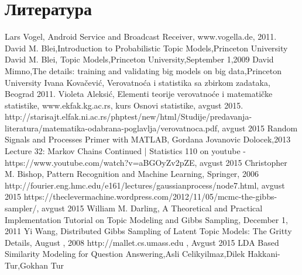 %
%
\chapter{Литература}
\begin{thebibliography}{11}
 {Lars Vogel, Android Service and Broadcast Receiver, www.vogella.de, 2011.}
 { David M. Blei,Introduction to Probabilistic Topic Models,Princeton University}
 { David M. Blei, Topic Models,Princeton University,September 1,2009}
 { David Mimno,The details: training	and validating big	models on big data,Princeton University}
 {Ivana Kovačević, Verovatnoća i statistika sa zbirkom zadataka, Beograd 2011.}
 {Violeta Aleksić, Elementi teorije verovatnoće i matematičke statistike, }
 {www.ekfak.kg.ac.rs, kurs Osnovi statistike, avgust 2015.}
 {http://starisajt.elfak.ni.ac.rs/phptest/new/html/Studije/predavanja-literatura/matematika-odabrana-poglavlja/verovatnoca.pdf, avgust 2015}
 {Random Signals and Processes Primer with MATLAB, Gordana Jovanovic Dolocek,2013}
 {Lecture 32: Markov Chains Continued | Statistics 110  on youtube - https://www.youtube.com/watch?v=aBGOyZv2pZE, avgust 2015}
 {Christopher M. Bishop, Pattern Recognition and
Machine Learning, Springer, 2006}
 {http://fourier.eng.hmc.edu/e161/lectures/gaussianprocess/node7.html, avgust 2015}
 {https://theclevermachine.wordpress.com/2012/11/05/mcmc-the-gibbs-sampler/, avgust 2015}
 {William M. Darling, A Theoretical and Practical Implementation Tutorial on Topic Modeling and Gibbs Sampling, December 1, 2011}
 {Yi Wang, Distributed Gibbs Sampling of Latent Topic Models: The Gritty Details, August , 2008}
 {http://mallet.cs.umass.edu , Avgust 2015}
 {LDA Based Similarity Modeling for Question Answering,Asli Celikyilmaz,Dilek Hakkani-Tur,Gokhan Tur}
\end{thebibliography}


